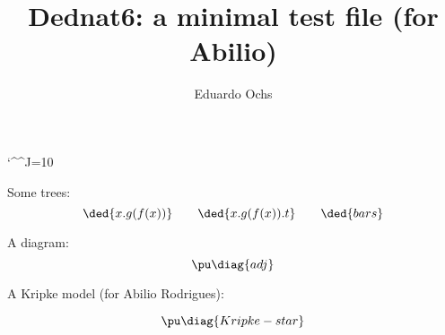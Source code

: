 \documentclass[oneside]{article}
\begin{document}
  \catcode`\^^J=10                      %


\title{Dednat6: a minimal test file (for Abilio)}
\author{Eduardo Ochs}
\maketitle

Some trees:
%
%
\pu
$$\ded{x.g(f(x))} \qquad \ded{x.g(f(x)).t} \qquad \ded{bars}$$




\def\catA{\mathbf{A}}
\def\catB{\mathbf{B}}

A diagram:
%
$$\pu
  \diag{adj}
$$

\bigskip

A Kripke model (for Abilio Rodrigues):


$$\pu
  \diag{Kripke-star}
$$
\end{document}
